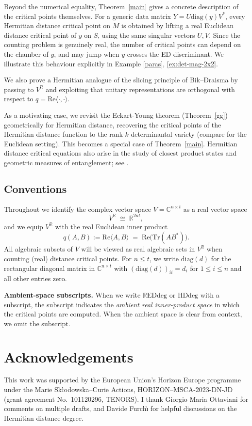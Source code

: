 \documentclass[11pt]{amsart}
\def\R{\mathbb R}\let\er\R
\def\C{\mathbb C}\let\ce\C
\theoremstyle{plain}
\theoremstyle{definition}
\theoremstyle{remark}
\begin{document}
Beyond the numerical equality, Theorem~\ref{main} gives a concrete description of the critical points themselves.  
For a generic data matrix $Y = U\mathrm{diag}(y)V^*$, every Hermitian distance critical point on $M$ is obtained by lifting a real Euclidean distance critical point of $y$ on $S$, using the same singular vectors $U,V$.  
Since the counting problem is genuinely real, the number of critical points can depend on the chamber of $y$, and may jump when $y$ crosses the ED discriminant. We illustrate this behaviour explicitly in Example \ref{paras}, \ref{ex:det-mag-2x2}.

We also prove a Hermitian analogue of the slicing principle of Bik--Draisma by passing to \(V^{\mathbb{R}}\) and exploiting that
unitary representations are orthogonal with respect to \(q=\mathrm{Re}\langle\cdot,\cdot\rangle\).

As a motivating case, we revisit the Eckart-Young theorem (Theorem~\ref{gg}) geometrically for Hermitian distance, recovering the
critical points of the Hermitian distance function to the rank-$k$ determinantal variety (compare \cite{ottaviani_paoletti_svd} for
the Euclidean setting). This becomes a special case of Theorem~\ref{main}. Hermitian distance critical equations also arise in the study of closest product states
and geometric measures of entanglement; see \cite{HillingSudbery2010}.

\subsection* {Conventions}
Throughout we identify the complex vector space $V=\C^{n\times t}$ as a real vector space
\[
V^\R \;\cong\; \R^{2nt},
\]
and we equip $V^\R$ with the real Euclidean inner product
\[
q(A,B):=\mathrm{Re}\langle A,B\rangle \;=\; \mathrm{Re}\big(\mathrm{Tr}(AB^*)\big).
\]
All algebraic subsets of $V$ will be viewed as real algebraic sets in $V^\R$ when counting
(real) distance critical points.
For $n\le t$, we write $\mathrm{diag}(d)$ for the rectangular diagonal matrix in $\C^{n\times t}$
with $(\mathrm{diag}(d))_{ii}=d_i$ for $1\le i\le n$ and all other entries zero.

\medskip
\noindent\textbf{Ambient-space subscripts.}
When we write $\R\mathrm{EDdeg}$ or $\mathrm{HDdeg}$ with a subscript, the subscript indicates
the \emph{ambient real inner-product space} in which the critical points are computed.
When the ambient space is clear from context, we omit the subscript.

\section*{Acknowledgements}
This work was supported by the European Union’s Horizon Europe programme under the Marie Sk\l{}odowska--Curie Actions,
HORIZON--MSCA-2023-DN-JD (grant agreement No.~101120296, TENORS). I thank Giorgio Maria Ottaviani for comments on multiple drafts,
and Davide Furch\`{\i} for helpful discussions on the Hermitian distance degree.
\end{document}
